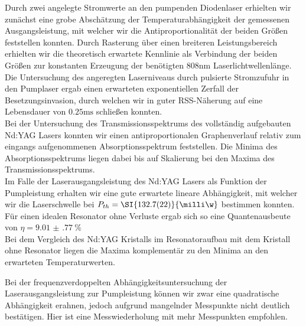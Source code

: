 \documentclass[../main.tex]{subfiles}
\begin{document}
    Durch zwei angelegte Stromwerte an den pumpenden Diodenlaser erhielten wir zunächst eine grobe Abschätzung der Temperaturabhängigkeit der gemessenen Ausgangsleistung, mit welcher wir die Antiproportionalität der beiden Größen feststellen konnten. Durch Rasterung über einen breiteren Leistungsbereich erhielten wir die theoretisch erwartete Kennlinie als Verbindung der beiden Größen zur konstanten Erzeugung der benötigten $808\si{\nm}$ Laserlichtwellenlänge. \\

    Die Untersuchung des angeregten Laserniveaus durch pulsierte Stromzufuhr in den Pumplaser ergab einen erwarteten exponentiellen Zerfall der Besetzungsinvasion, durch welchen wir in guter RSS-Näherung auf eine Lebensdauer von $0.25\si{\ms}$ schließen konnten. \\

    Bei der Untersuchung des Transmissionsspektrums des vollständig aufgebauten Nd:YAG Lasers konnten wir einen antiproportionalen Graphenverlauf relativ zum eingangs aufgenommenen Absorptionsspektrum feststellen. Die Minima des Absorptionsspektrums liegen dabei bis auf Skalierung bei den Maxima des Transmissionsspektrums. \\

    Im Falle der Laserausgangsleistung des Nd:YAG Lasers als Funktion der Pumpleistung erhalten wir eine gute erwartete lineare Abhängigkeit, mit welcher wir die Laserschwelle bei $P_{th} = \SI{132.7(22)}{\milli\w}$ bestimmen konnten. Für einen idealen Resonator ohne Verluste ergab sich so eine Quantenausbeute von $\eta = \SI{9.01(77)}{\percent}$\\

    Bei dem Vergleich des Nd:YAG Kristalls im Resonatoraufbau mit dem Kristall ohne Resonator liegen die Maxima komplementär zu den Minima an den erwarteten Temperaturwerten. 

    Bei der frequenzverdoppelten Abhängigkeitsuntersuchung der Laserausgangsleistung zur Pumpleistung können wir zwar eine quadratische Abhängigkeit erahnen, jedoch aufgrund mangelnder Messpunkte nicht deutlich bestätigen. Hier ist eine Messwiederholung mit mehr Messpunkten empfohlen. 
\end{document}
